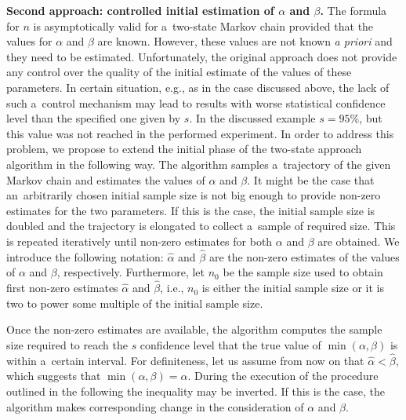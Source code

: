 \documentclass[runningheads,a4paper]{llncs}
\begin{document}
\medskip
\noindent
{\bf Second approach: controlled initial estimation of $\alpha$ and $\beta$.}
The formula for $n$ is asymptotically valid for a~two-state Markov chain provided that the values
for $\alpha$ and $\beta$ are known. However, these values are not known \emph{a priori} and they
need to be estimated. Unfortunately, the original approach does not provide any control over the
quality of the initial estimate of the values of these parameters. In certain situation, e.g., as
in the case discussed above, the lack of such a~control mechanism may lead to results with worse
statistical confidence level than the specified one given by $s$. In the discussed example
$s=95\%$, but this value was not reached in the performed experiment. In order to address this
problem, we propose to extend the initial phase of the two-state approach algorithm in the
following way. The algorithm samples a~trajectory of the given Markov chain and estimates the
values of $\alpha$ and $\beta$. It might be the case that an~arbitrarily chosen initial sample
size is not big enough to provide non-zero estimates for the two parameters. If this is the case,
the initial sample size is doubled and the trajectory is elongated to collect a~sample of required
size. This is repeated iteratively until non-zero estimates for both $\alpha$ and $\beta$ are
obtained. We introduce the following notation: $\hat{\alpha}$ and $\hat{\beta}$ are the non-zero
estimates of the values of $\alpha$ and $\beta$, respectively. Furthermore, let $n_0$ be the
sample size used to obtain first non-zero estimates $\hat{\alpha}$ and $\hat{\beta}$, i.e., $n_0$
is either the initial sample size or it is two to power some multiple of the initial sample size.

Once the non-zero estimates are available, the algorithm computes the sample size required to
reach the $s$ confidence level that the true value of $\min(\alpha,\beta)$ is within
a~certain interval. For definiteness, let us assume from now on that $\hat{\alpha}<\hat{\beta}$,
which suggests that $\min(\alpha,\beta)=\alpha$. During the execution of the procedure outlined in
the following the inequality may be inverted. If this is the case, the algorithm makes 
corresponding change in the consideration of $\alpha$ and $\beta$.
\end{document}
